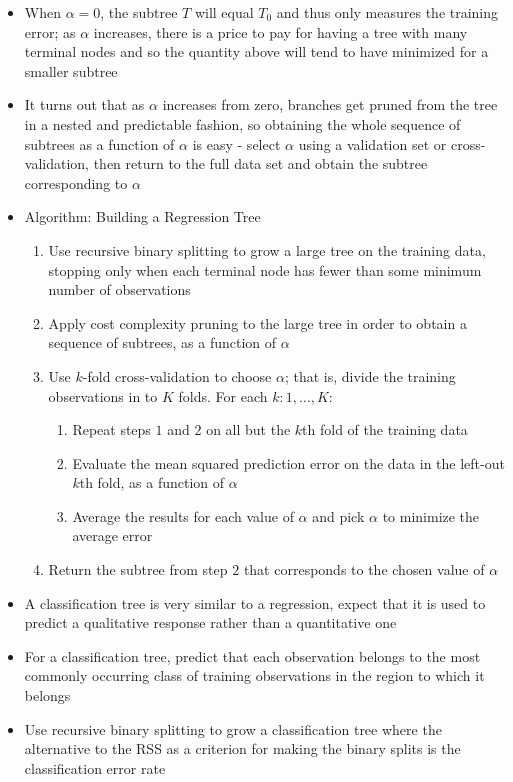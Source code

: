 \documentclass[12pt]{article}
\begin{document}
\begin{itemize}
\item When $\alpha = 0$, the subtree $T$ will equal $T_0$ and thus only measures the training error; as $\alpha$ increases, there is a price to pay for having a tree with many terminal nodes and so the quantity above will tend to have minimized for a smaller subtree 
\item It turns out that as $\alpha$ increases from zero, branches get pruned from the tree in a nested and predictable fashion, so obtaining the whole sequence of subtrees as a function of $\alpha$ is easy - select $\alpha$ using a validation set or cross-validation, then return to the full data set and obtain the subtree corresponding to $\alpha$ 
\item Algorithm: Building a Regression Tree \begin{enumerate} 
\item Use recursive binary splitting to grow a large tree on the training data, stopping only when each terminal node has fewer than some minimum number of observations 
\item Apply cost complexity pruning to the large tree in order to obtain a sequence of subtrees, as a function of $\alpha$
\item Use $k$-fold cross-validation to choose $\alpha$; that is, divide the training observations in to $K$ folds. For each $k:1,\dots,K$: \begin{enumerate} 
\item Repeat steps $1$ and $2$ on all but the $k$th fold of the training data 
\item Evaluate the mean squared prediction error on the data in the left-out $k$th fold, as a function of $\alpha$ 
\item Average the results for each value of $\alpha$ and pick $\alpha$ to minimize the average error \end{enumerate} 
\item Return the subtree from step $2$ that corresponds to the chosen value of $\alpha$ \end{enumerate} 
\item A classification tree is very similar to a regression, expect that it is used to predict a qualitative response rather than a quantitative one 
\item For a classification tree, predict that each observation belongs to the most commonly occurring class of training observations in the region to which it belongs 
\item Use recursive binary splitting to grow a classification tree where the alternative to the RSS as a criterion for making the binary splits is the classification error rate 

\end{itemize}
\end{document}
